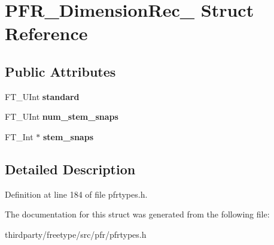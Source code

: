 \hypertarget{struct_p_f_r___dimension_rec__}{}\section{P\+F\+R\+\_\+\+Dimension\+Rec\+\_\+ Struct Reference}
\label{struct_p_f_r___dimension_rec__}
\subsection*{Public Attributes}
\begin{DoxyCompactItemize}
\item 
\mbox{\label{struct_p_f_r___dimension_rec___ac1a5ce51d40ecc9b976c4d654ded6ef7}} 
F\+T\+\_\+\+U\+Int {\bfseries standard}
\item 
\mbox{\label{struct_p_f_r___dimension_rec___a66d7e73d886eba1963cefbcaaa53998b}} 
F\+T\+\_\+\+U\+Int {\bfseries num\+\_\+stem\+\_\+snaps}
\item 
\mbox{\label{struct_p_f_r___dimension_rec___ac3bc5c72b9a9320c5f77bf266df71ec3}} 
F\+T\+\_\+\+Int $\ast$ {\bfseries stem\+\_\+snaps}
\end{DoxyCompactItemize}


\subsection{Detailed Description}


Definition at line 184 of file pfrtypes.\+h.



The documentation for this struct was generated from the following file\+:\begin{DoxyCompactItemize}
\item 
thirdparty/freetype/src/pfr/pfrtypes.\+h\end{DoxyCompactItemize}
